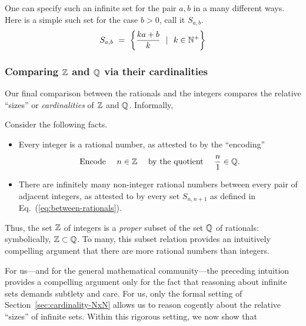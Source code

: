 \smallskip

One can specify such an infinite set for the pair $a,b$ in a many different ways.  Here is a simple such set for the case $b > 0$, call it $S_{a,b}$.
\begin{equation}
\label{eq:between-rationals}
S_{a,b} \ = \ \left\{ \frac{ka+b}{k} \ \ | \ \ k \in \mathbb{N}^+ \right\}
\end{equation}

\subsubsection{Comparing $\mathbb{Z}$ and $\mathbb{Q}$ via their cardinalities}
\label{sec:Q-Z-cardinality}

Our final comparison between the rationals and the integers compares the relative ``sizes'' or {\em cardinalities} of $\mathbb{Z}$ and $\mathbb{Q}$.  Informally, 

\smallskip

\hspace*{.35in}{\it Are there ``more'' rationals than integers?}

\medskip

\noindent Consider the following facts.
\begin{itemize}
\item
Every integer is a rational number, as attested to by the ``encoding''
\begin{equation}
\label{eq:ZintoQ}
\mbox{Encode } \ \ \ n \in \mathbb{Z} \ \ \ \mbox{ by the quotient } \ \ \ {n \over 1} \in \mathbb{Q} .
\end{equation}

\medskip\item
There are infinitely many non-integer rational numbers between every pair of adjacent integers, as attested to by every set $S_{n,n+1}$ as defined in Eq.~(\ref{eq:between-rationals}).
\end{itemize}
Thus, the set $\mathbb{Z}$ of integers is a {\em proper} subset of the set $\mathbb{Q}$ of rationals: symbolically, $\mathbb{Z} \subset \mathbb{Q}$.  To many, this subset relation provides an intuitively compelling argument that there are more rational numbers than integers.

For us---and for the general mathematical community---the preceding intuition provides a compelling argument only for the fact that reasoning about infinite sets demands subtlety and care.  For us, only the formal setting of Section~\ref{sec:cardinality-NxN} allows us to reason cogently about the relative ``sizes'' of infinite sets.  Within this rigorous setting, we now show that

